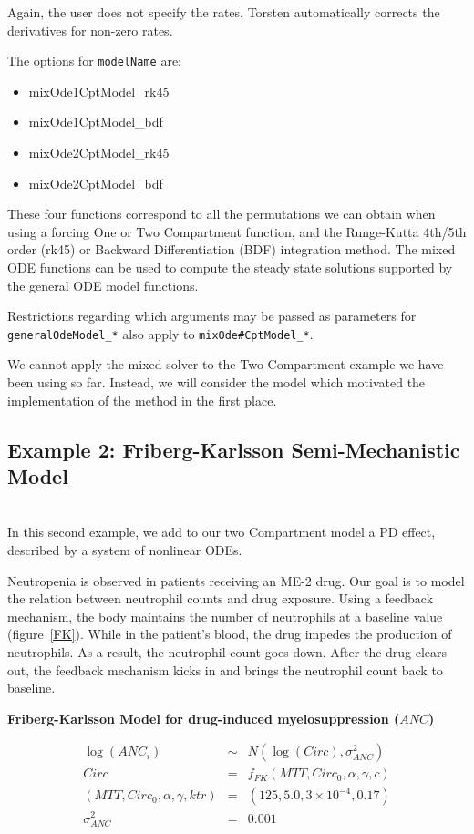 \documentclass[11pt]{amsart}
\begin{document}
 Again, the user does not specify the rates. Torsten automatically corrects the derivatives for non-zero rates.

The options for \texttt{modelName} are:
\begin{itemize}
  \item mixOde1CptModel\_rk45
  \item mixOde1CptModel\_bdf
  \item mixOde2CptModel\_rk45
  \item mixOde2CptModel\_bdf
\end{itemize}

These four functions correspond to all the permutations we can obtain when using a forcing One or Two Compartment function, and the Runge-Kutta 4th/5th order (rk45) or Backward Differentiation (BDF) integration method. The mixed ODE functions can be used to compute the steady state solutions supported by the general ODE model functions.

Restrictions regarding which arguments may be passed as parameters for \texttt{generalOdeModel\_*} also apply to \texttt{mixOde\#CptModel\_*}.

We cannot apply the mixed solver to the Two Compartment example we have been using so far. Instead, we will consider the model which motivated the implementation of the method in the first place.

\subsection{Example 2: Friberg-Karlsson Semi-Mechanistic Model \cite{2364}} \ \\

In this second example, we add to our two Compartment model a PD effect, described by a system of nonlinear ODEs.

Neutropenia is observed in patients receiving an ME-2 drug. Our goal is to model the relation between neutrophil counts and drug exposure. Using a feedback mechanism, the body maintains the number of neutrophils at a baseline value (figure~\ref{FK}). While in the patient's blood, the drug impedes the production of neutrophils. As a result, the neutrophil count goes down. After  the drug clears out, the feedback mechanism kicks in and brings the neutrophil count back to baseline.

{\bf Friberg-Karlsson Model for drug-induced myelosuppression ($ANC$)}

\begin{eqnarray*}
  \log(ANC_i) &\sim& N(\log(Circ), \sigma^2_{ANC})  \\
  Circ &=& f_{FK}(MTT, Circ_{0}, \alpha, \gamma, c)  \\
  (MTT, Circ_{0}, \alpha, \gamma, ktr) &=& (125, 5.0, 3 \times 10^{-4}, 0.17) \\
  \sigma^2_{ANC} &=& 0.001
\end{eqnarray*}
\end{document}
